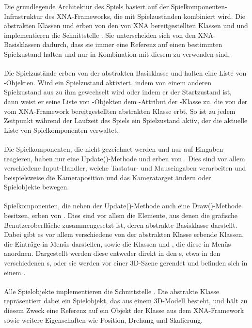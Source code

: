 Die grundlegende Architektur des Spiels basiert auf der Spielkomponenten-Infrastruktur des XNA-Frameworks, die mit Spielzuständen kombiniert wird. Die abstrakten Klassen  und  erben von den von XNA bereitgestellten Klassen  und  und implementieren die Schnittstelle . Sie unterscheiden sich von den XNA-Basisklassen dadurch, dass sie immer eine Referenz auf einen bestimmten Spielzustand halten und nur in Kombination mit diesem zu verwenden sind.
\\\\
Die Spielzustände erben von der abstrakten Basisklasse  und halten eine Liste von -Objekten. Wird ein Spielzustand aktiviert, indem von einem anderen Spielzustand aus zu ihm gewechselt wird oder indem er der Startzustand ist, dann weist er seine Liste von -Objekten dem -Attribut der -Klasse zu, die von der vom XNA-Framework bereitgestellten abstrakten Klasse  erbt. So ist zu jedem Zeitpunkt während der Laufzeit des Spiels ein Spielzustand aktiv, der die aktuelle Liste von Spielkomponenten verwaltet.
\\\\
Die Spielkomponenten, die nicht gezeichnet werden und nur auf Eingaben reagieren, haben nur eine Update()-Methode und erben von . Dies sind vor allem verschiedene Input-Handler, welche Tastatur- und Mauseingaben verarbeiten und beispielsweise die Kameraposition und das Kameratarget ändern oder Spielobjekte bewegen.
\\\\
Spielkomponenten, die neben der Update()-Methode auch eine Draw()-Methode besitzen, erben von . Dies sind vor allem die Elemente, aus denen die grafische Benutzeroberfläche zusammengesetzt ist, deren abstrakte Basisklasse  darstellt. Dabei gibt es vor allem verschiedene von der abstrakten Klasse  erbende Klassen, die Einträge in Menüs darstellen, sowie die Klassen  und , die diese in Menüs anordnen. Dargestellt werden diese entweder direkt in den s, etwa in den verschiedenen s, oder sie werden vor einer 3D-Szene gerendet und befinden sich in einem .
\\\\
Alle Spielobjekte implementieren die Schnittstelle . Die abstrakte Klasse  repräsentiert dabei ein Spielobjekt, das aus einem 3D-Modell besteht, und hält zu diesem Zweck eine Referenz auf ein Objekt der Klasse  aus dem XNA-Framework sowie weitere Eigenschaften wie Position, Drehung und Skalierung.

